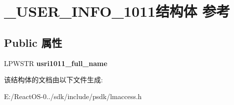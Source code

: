 \hypertarget{struct___u_s_e_r___i_n_f_o__1011}{}\section{\+\_\+\+U\+S\+E\+R\+\_\+\+I\+N\+F\+O\+\_\+1011结构体 参考}
\label{struct___u_s_e_r___i_n_f_o__1011}
\subsection*{Public 属性}
\begin{DoxyCompactItemize}
\item 
\mbox{\label{struct___u_s_e_r___i_n_f_o__1011_a9c86243132e909bbebf3e2835eca73c8}} 
L\+P\+W\+S\+TR {\bfseries usri1011\+\_\+full\+\_\+name}
\end{DoxyCompactItemize}


该结构体的文档由以下文件生成\+:\begin{DoxyCompactItemize}
\item 
E\+:/\+React\+O\+S-\/0../sdk/include/psdk/lmaccess.\+h\end{DoxyCompactItemize}
